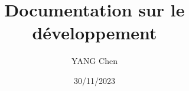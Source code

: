 \documentclass{article}
\title{Documentation sur le développement}
\date{30/11/2023}
\author{YANG Chen}
\begin{document}
\maketitle
\tableofcontents
\newpage

\end{document}
